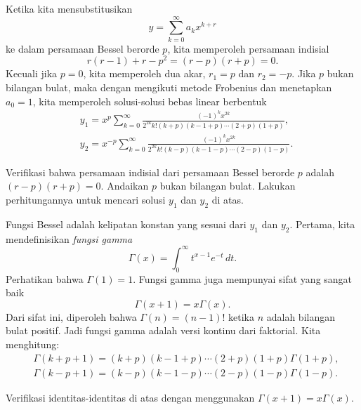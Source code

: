 Ketika kita mensubstitusikan
\begin{equation*}
y = \sum_{k=0}^\infty a_k x^{k+r}
\end{equation*}
ke dalam persamaan Bessel berorde $p$, kita memperoleh persamaan indisial
\begin{equation*}
r(r-1)+r-p^2 = (r-p)(r+p) = 0 .
\end{equation*}
Kecuali jika $p=0$, kita memperoleh dua akar, $r_1 = p$ dan $r_2 = -p$.
Jika $p$ bukan bilangan bulat, maka dengan mengikuti metode Frobenius dan
menetapkan $a_0 = 1$, kita memperoleh
solusi-solusi bebas linear berbentuk
\begin{align*}
& y_1 = x^p \sum_{k=0}^\infty
\frac{{(-1)}^k x^{2k}}{2^{2k} k! (k+p)(k-1+p)\cdots (2+p)(1+p)} ,
\\
& y_2 = x^{-p} \sum_{k=0}^\infty
\frac{{(-1)}^k x^{2k}}{2^{2k} k! (k-p)(k-1-p)\cdots (2-p)(1-p)} .
\end{align*}

\begin{exercise}
\leavevmode
\begin{tasks}
\task
Verifikasi bahwa persamaan indisial dari persamaan Bessel berorde $p$ adalah
$(r-p)(r+p)=0$.
\task
Andaikan $p$ bukan bilangan bulat. Lakukan perhitungannya
untuk mencari solusi $y_1$ dan $y_2$ di atas.
\end{tasks}
\end{exercise}

Fungsi Bessel adalah kelipatan konstan yang sesuai dari $y_1$ dan $y_2$.
Pertama, kita mendefinisikan \emph{fungsi gamma}
\begin{equation*}
\Gamma(x) = \int_0^\infty t^{x-1} e^{-t} \, dt .
\end{equation*}
Perhatikan bahwa $\Gamma(1) = 1$.
Fungsi gamma juga mempunyai sifat yang sangat baik
\begin{equation*}
\Gamma(x+1) = x \Gamma(x) .
\end{equation*}
Dari sifat ini, diperoleh bahwa $\Gamma(n) = (n-1)!$ ketika $n$ adalah
bilangan bulat positif. Jadi fungsi gamma adalah versi kontinu dari faktorial. Kita
menghitung:
\begin{align*}
& \Gamma(k+p+1)=(k+p)(k-1+p)\cdots (2+p)(1+p) \Gamma(1+p) ,
\\
& \Gamma(k-p+1)=(k-p)(k-1-p)\cdots (2-p)(1-p) \Gamma(1-p) .
\end{align*}

\begin{exercise}
Verifikasi identitas-identitas di atas dengan menggunakan 
$\Gamma(x+1) = x \Gamma(x)$.
\end{exercise}

